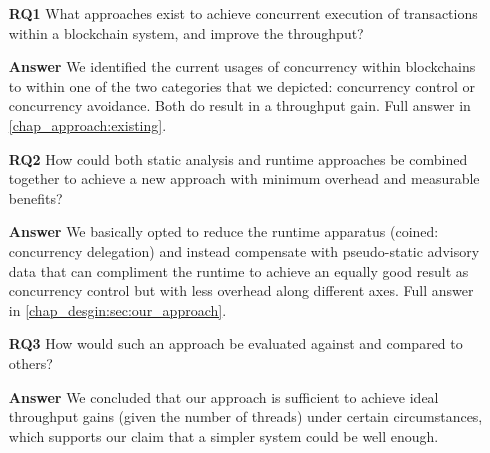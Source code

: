 \begin{enumerate}
	\item [\textbf{RQ1}] What approaches exist to achieve concurrent execution of transactions
	within a blockchain system, and improve the throughput?

	\item [\textbf{Answer}] We identified the current usages of concurrency within blockchains to
	within one of the two categories that we depicted: concurrency control or concurrency avoidance.
	Both do result in a throughput gain. Full answer in \ref{chap_approach:existing}.

	\item [\textbf{RQ2}] How could both static analysis and runtime approaches be combined together
	to achieve a new approach with minimum overhead and measurable benefits?

	\item [\textbf{Answer}] We basically opted to reduce the runtime apparatus (coined: concurrency
	delegation) and instead compensate with pseudo-static advisory data that can compliment the
	runtime to achieve an equally good result as concurrency control but with less overhead along
	different axes. Full answer in \ref{chap_desgin:sec:our_approach}.

	\item [\textbf{RQ3}] How would such an approach be evaluated against and compared to others?

	\item [\textbf{Answer}] We concluded that our approach is sufficient to achieve ideal throughput
	gains (given the number of threads) under certain circumstances, which supports our claim that a
	simpler system could be well enough.
\end{enumerate}
